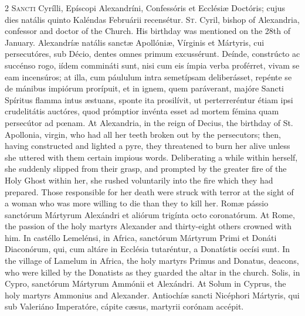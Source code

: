 \begin{paracol}{2}
\lettrine[lines=2]{S}{ancti} Cyrílli, Epíscopi Alexandríni, Confessóris et Ecclésiæ 
 Doctóris; cujus dies natális quinto Kaléndas Februárii recensétur.
\switchcolumn
{}
\lettrine[lines=2]{S}{t.} Cyril, bishop of Alexandria, confessor and doctor of the Church. 
 His birthday was mentioned on the 28th of January.
\switchcolumn*
{}
Alexandríæ natális sanctæ Apollóniæ, Vírginis 
 et Mártyris, cui persecutóres, sub Décio, dentes omnes primum excussérunt. 
 Deínde, constrúcto ac succénso rogo, iídem commináti sunt, nisi cum eis ímpia verba proférret, vivam se eam incensúros; at illa, cum páululum intra 
 semetípsam deliberásset, repénte se de mánibus impiórum prorípuit, et in 
 ignem, quem paráverant, majóre Sancti Spíritus flamma intus æstuans, sponte 
 ita prosilívit, ut perterreréntur étiam ipsi crudelitátis auctóres, quod 
 prómptior invénta esset ad mortem fémina quam persecútor ad pœnam.
\switchcolumn
{}
At Alexandria, in the reign of Decius, the birthday of St. Apollonia, 
 virgin, who had all her teeth broken out by the persecutors; then, having 
 constructed and lighted a pyre, they threatened to burn her alive unless she 
 uttered with them certain impious words. Deliberating a while within 
 herself, she suddenly slipped from their grasp, and prompted by the greater 
 fire of the Holy Ghost within her, she rushed voluntarily into the fire 
 which they had prepared. Those responsible for her death were struck 
 with terror at the sight of a woman who was more willing to die than they to 
 kill her.
\switchcolumn*
{}
Romæ pássio sanctórum Mártyrum Alexándri et 
 aliórum trigínta octo coronatórum.
\switchcolumn
{}
At Rome, the passion of the holy martyrs Alexander and thirty-eight others 
 crowned with him.
\switchcolumn*
{}
In castéllo Lemelénsi, in Africa, sanctórum Mártyrum Primi et Donáti 
 Diaconórum, qui, cum altáre in Ecclésia tutaréntur, a Donatístis occísi sunt.
\switchcolumn
{}
In the village of Lamelum in Africa, the holy martyrs Primus and Donatus, 
 deacons, who were killed by the Donatists as they guarded the altar in the 
 church.
\switchcolumn*
{}
Solis, in Cypro, sanctórum Mártyrum Ammónii et Alexándri.
\switchcolumn
{}
At Solum in Cyprus, the holy martyrs Ammonius and Alexander.
\switchcolumn*
{}
Antiochíæ sancti Nicéphori Mártyris, qui sub 
 Valeriáno Imperatóre, cápite cæsus, martyrii corónam accépit.

\end{paracol}
